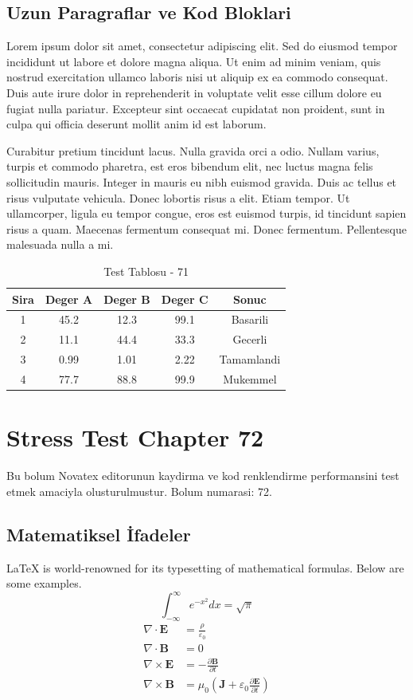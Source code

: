 \documentclass[12pt,a4paper]{article}
\begin{document}
\subsection{Uzun Paragraflar ve Kod Bloklari}
Lorem ipsum dolor sit amet, consectetur adipiscing elit. Sed do eiusmod tempor incididunt ut labore et dolore magna aliqua. Ut enim ad minim veniam, quis nostrud exercitation ullamco laboris nisi ut aliquip ex ea commodo consequat. Duis aute irure dolor in reprehenderit in voluptate velit esse cillum dolore eu fugiat nulla pariatur. Excepteur sint occaecat cupidatat non proident, sunt in culpa qui officia deserunt mollit anim id est laborum.

Curabitur pretium tincidunt lacus. Nulla gravida orci a odio. Nullam varius, turpis et commodo pharetra, est eros bibendum elit, nec luctus magna felis sollicitudin mauris. Integer in mauris eu nibh euismod gravida. Duis ac tellus et risus vulputate vehicula. Donec lobortis risus a elit. Etiam tempor. Ut ullamcorper, ligula eu tempor congue, eros est euismod turpis, id tincidunt sapien risus a quam. Maecenas fermentum consequat mi. Donec fermentum. Pellentesque malesuada nulla a mi.

\begin{table}[h!]
\centering
\begin{tabular}{|c|c|c|c|c|}
\hline
\textbf{Sira} & \textbf{Deger A} & \textbf{Deger B} & \textbf{Deger C} & \textbf{Sonuc} \\
\hline
1 & 45.2 & 12.3 & 99.1 & Basarili \\
2 & 11.1 & 44.4 & 33.3 & Gecerli \\
3 & 0.99 & 1.01 & 2.22 & Tamamlandi \\
4 & 77.7 & 88.8 & 99.9 & Mukemmel \\
\hline
\end{tabular}
\caption{Test Tablosu - 71}
\end{table}

\newpage
\section{Stress Test Chapter 72}
Bu bolum Novatex editorunun kaydirma ve kod renklendirme performansini test etmek amaciyla olusturulmustur. Bolum numarasi: 72.

\subsection{Matematiksel İfadeler}
\LaTeX{} is world-renowned for its typesetting of mathematical formulas. Below are some examples.
\begin{equation}
\int_{-\infty}^{\infty} e^{-x^2} dx = \sqrt{\pi}
\end{equation}
\begin{align}
\nabla \cdot \mathbf{E} &= \frac{\rho}{\varepsilon_0} \\
\nabla \cdot \mathbf{B} &= 0 \\
\nabla \times \mathbf{E} &= -\frac{\partial \mathbf{B}}{\partial t} \\
\nabla \times \mathbf{B} &= \mu_0\left(\mathbf{J} + \varepsilon_0 \frac{\partial \mathbf{E}}{\partial t}\right)
\end{align}
\end{document}
